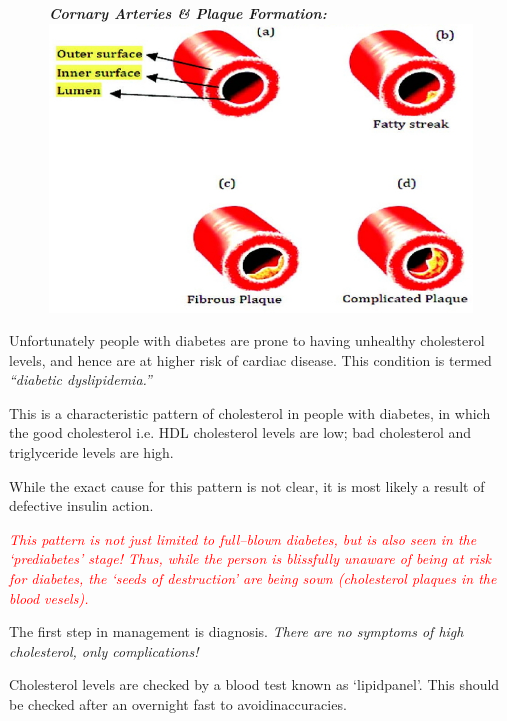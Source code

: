 \begin{figure}[h]
\centering
\textbf{\textit{Cornary Arteries \& Plaque Formation:}}\\
\includegraphics[scale=1.9]{images/044.jpg}
\end{figure}

Unfortunately people with diabetes are prone to having unhealthy cholesterol levels, and hence are at higher risk of cardiac disease. This condition is termed \textit{“diabetic dyslipidemia.”}


This is a characteristic pattern of cholesterol in people with diabetes, in which the good cholesterol i.e. HDL cholesterol levels are low; bad cholesterol and triglyceride levels are high.

While the exact cause for this pattern is not clear, it is most likely a result of defective insulin action.

\textcolor{red}{\textit{This pattern is not just limited to full–blown diabetes, but is also seen in the ‘prediabetes’ stage! Thus, while the person is blissfully unaware of being at risk for diabetes, the ‘seeds of destruction’ are being sown (cholesterol plaques in the blood vesels).}}


The first step in management is diagnosis. \textit{There are no symptoms of high cholesterol, only complications!}

Cholesterol levels are checked by a blood test known as ‘lipid\break panel’. This should be checked after an overnight fast to avoid\break inaccuracies.

